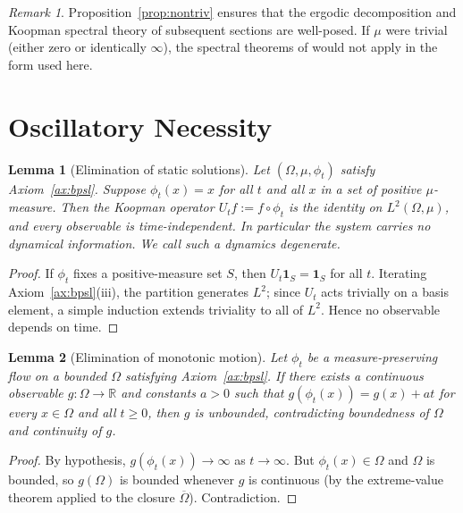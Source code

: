\documentclass[11pt,twocolumn,a4paper]{article}
\theoremstyle{axiomstyle}
\theoremstyle{conseqstyle}
\newtheorem{lemma}{Lemma}
\theoremstyle{definition}
\theoremstyle{remark}
\newtheorem*{remark}{Remark}
\newcommand{\Real}{\mathbb{R}}
\begin{document}
\begin{remark}
Proposition~\ref{prop:nontriv} ensures that the ergodic decomposition and Koopman spectral theory of subsequent sections are well-posed. If $\mu$ were trivial (either zero or identically $\infty$), the spectral theorems of \citet{birkhoff1931,koopman1931} would not apply in the form used here.
\end{remark}

\section{Oscillatory Necessity}
\label{sec:oscillatory}

\begin{lemma}[Elimination of static solutions]
\label{lem:staticelim}
Let $(\Omega,\mu,\phi_{t})$ satisfy Axiom~\ref{ax:bpsl}. Suppose $\phi_{t}(x)=x$ for all $t$ and all $x$ in a set of positive $\mu$-measure. Then the Koopman operator $U_{t}f:=f\circ\phi_{t}$ is the identity on $L^{2}(\Omega,\mu)$, and every observable is time-independent. In particular the system carries no dynamical information. We call such a dynamics \emph{degenerate}.
\end{lemma}
\begin{proof}
If $\phi_{t}$ fixes a positive-measure set $S$, then $U_{t}\mathbf{1}_{S}=\mathbf{1}_{S}$ for all $t$. Iterating Axiom~\ref{ax:bpsl}(iii), the partition generates $L^{2}$; since $U_{t}$ acts trivially on a basis element, a simple induction extends triviality to all of $L^{2}$. Hence no observable depends on time.
\end{proof}

\begin{lemma}[Elimination of monotonic motion]
\label{lem:monotonicelim}
Let $\phi_{t}$ be a measure-preserving flow on a bounded $\Omega$ satisfying Axiom~\ref{ax:bpsl}. If there exists a continuous observable $g\colon\Omega\to\Real$ and constants $a>0$ such that $g(\phi_{t}(x))=g(x)+at$ for every $x\in\Omega$ and all $t\ge 0$, then $g$ is unbounded, contradicting boundedness of $\Omega$ and continuity of $g$.
\end{lemma}
\begin{proof}
By hypothesis, $g(\phi_{t}(x))\to\infty$ as $t\to\infty$. But $\phi_{t}(x)\in\Omega$ and $\Omega$ is bounded, so $g(\Omega)$ is bounded whenever $g$ is continuous (by the extreme-value theorem applied to the closure $\overline{\Omega}$). Contradiction.
\end{proof}
\end{document}
